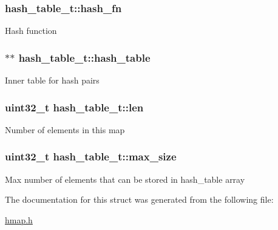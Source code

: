 \subsubsection[{hash\+\_\+fn}]{ hash\+\_\+table\+\_\+t\+::hash\+\_\+fn}\label{structhash__table__t_ae54423e7e3b478ef5c043f8249230240}
Hash function \hypertarget{structhash__table__t_af1f25086c6dca382a9b3762daa9c0d41}{}
\subsubsection[{hash\+\_\+table}]{$\ast$$\ast$ hash\+\_\+table\+\_\+t\+::hash\+\_\+table}\label{structhash__table__t_af1f25086c6dca382a9b3762daa9c0d41}
Inner table for hash pairs \hypertarget{structhash__table__t_a9223de4b81823920a768881cb3dd57cf}{}
\subsubsection[{len}]{\setlength{\rightskip}{0pt plus 5cm}uint32\+\_\+t hash\+\_\+table\+\_\+t\+::len}\label{structhash__table__t_a9223de4b81823920a768881cb3dd57cf}
Number of elements in this map \hypertarget{structhash__table__t_ad87cf56530f2815d1a0b52dfd8ffbc82}{}
\subsubsection[{max\+\_\+size}]{\setlength{\rightskip}{0pt plus 5cm}uint32\+\_\+t hash\+\_\+table\+\_\+t\+::max\+\_\+size}\label{structhash__table__t_ad87cf56530f2815d1a0b52dfd8ffbc82}
Max number of elements that can be stored in hash\+\_\+table array 

The documentation for this struct was generated from the following file\+:\begin{DoxyCompactItemize}
\item 
\hyperlink{hmap_8h}{hmap.\+h}\end{DoxyCompactItemize}
